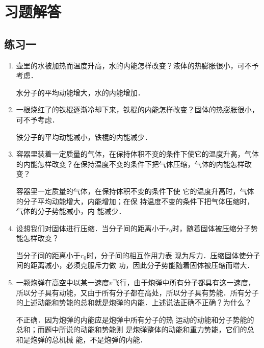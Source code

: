 \section{习题解答}

\subsection{练习一}

\begin{enumerate}
	\item 壶里的水被加热而温度升高，水的内能怎样改变？液体的热膨胀很小，可不予考虑．
	
\begin{solution}
    水分子的平均动能增大，水的内能增加．
\end{solution}    
\item 一根烧红了的铁棍逐渐冷却下来，铁棍的内能怎样改变？固体的热膨胀很小，可不予考虑．
	
\begin{solution}
    铁分子的平均动能减小，铁棍的内能减少．
\end{solution}    
\item 容器里装着一定质量的气体，在保持体积不变的条件下使它的温度升高，气体的内能怎样改变？在保持温度不变的条件下把气体压缩，气体的内能怎样改变？
	
\begin{solution}
    容器里一定质量的气体，在保持体积不变的条件下使
它的温度升高时，气体的分子平均动能增大，内能增加；在保
持温度不变的条件下把气体压缩时，气体的分子势能减小，内
能减少．
\end{solution}    
\item 设想我们对固体进行压缩．当分子间的距离小于$r_0$时，随着固体被压缩分子势能怎样改变？
	
\begin{solution}
    当分子间的距离小于$r_0$时，分子间的相互作用力表
现为斥力．压缩固体使分子间的距离减小，必须克服斥力做
功，因此分子势能随着固体被压缩而增大．
\end{solution}    
\item 一颗炮弹在高空中以某一速度$v$飞行，由于炮弹中所有分子都具有这一速度，所以分子具有动能，又由于所有分子都在高处，所以分子具有势能．所有分子的上述动能和势能的总和就是炮弹的内能．上述说法正确不正确？为什么？
	
\begin{solution}
    不正确．因为炮弹的内能应是炮弹中所有分子的热
运动的动能和分子势能的总和；而题中所说的动能和势能则
是炮弹整体的动能和重力势能，它们的总和是炮弹的总机械
能，不是炮弹的内能．
\end{solution}    
\end{enumerate}

